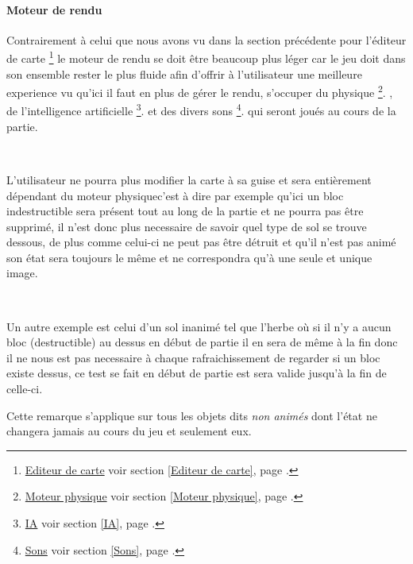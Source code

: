 		\paragraph{Moteur de rendu\\}
		
			\hypertarget{Moteur de rendu}{}
			\label{Moteur de rendu}
		
			Contrairement à celui que nous avons vu dans la section précédente pour
			l'éditeur de carte
			\footnote{
				\hyperlink{Editeur de carte}{Editeur de carte}
				\og voir section \ref{Editeur de carte}, page \pageref{Editeur de carte}.\fg
			}
			le moteur de rendu se doit être beaucoup plus léger car le jeu doit dans son
			ensemble rester le plus fluide afin d'offrir à l'utilisateur une meilleure
			experience vu qu'ici il faut en plus de gérer le rendu, s'occuper du
			physique
			\footnote{
				\hyperlink{Moteur physique}{Moteur physique}
				\og voir section \ref{Moteur physique}, page \pageref{Moteur physique}.\fg
			}.
			, de l'intelligence artificielle
			\footnote{
				\hyperlink{IA}{IA}
				\og voir section \ref{IA}, page \pageref{IA}.\fg
			}.
			et des divers sons
			\footnote{
				\hyperlink{Sons}{Sons}
				\og voir section \ref{Sons}, page \pageref{Sons}.\fg
			}.
			qui seront joués au cours de la partie.		
			
			$\,$	
			
			L'utilisateur ne pourra plus modifier la carte à sa guise et sera
			entièrement dépendant du moteur physique\footnotemark[3] c'est à dire par
			exemple qu'ici un bloc indestructible sera présent tout au long de la
			partie et ne pourra pas être supprimé, il n'est donc plus necessaire de
			savoir quel type de sol se trouve dessous, de plus comme celui-ci ne peut pas
			être détruit et qu'il n'est pas animé son état sera toujours le même et ne
			correspondra qu'à une seule et unique image.
			
			$\,$			
			
			Un autre exemple est celui d'un sol inanimé tel que l'herbe où si il n'y a
			aucun bloc (destructible) au dessus en début de partie il en sera de même à
			la fin donc il ne nous est pas necessaire à chaque rafraichissement de
			regarder si un bloc existe dessus, ce test se fait en début de partie est
			sera valide jusqu'à la fin de celle-ci.
			
			
			Cette remarque s'applique sur tous les objets dits \emph{non animés} dont
			l'état ne changera jamais au cours du jeu et seulement eux.
			
